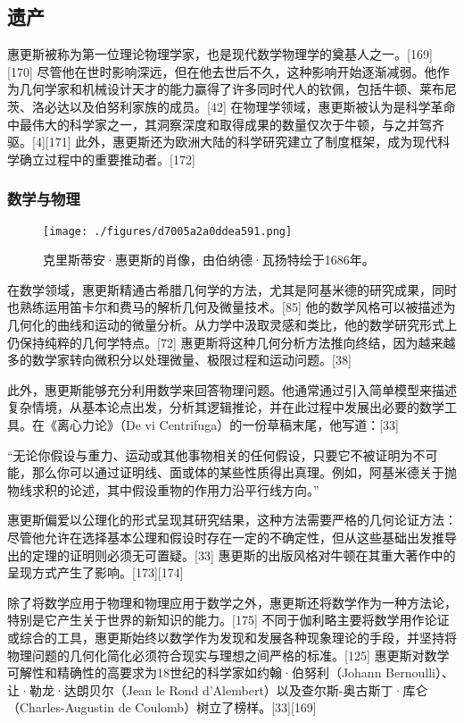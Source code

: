 \subsection{遗产}
惠更斯被称为第一位理论物理学家，也是现代数学物理学的奠基人之一。[169][170] 尽管他在世时影响深远，但在他去世后不久，这种影响开始逐渐减弱。他作为几何学家和机械设计天才的能力赢得了许多同时代人的钦佩，包括牛顿、莱布尼茨、洛必达以及伯努利家族的成员。[42] 在物理学领域，惠更斯被认为是科学革命中最伟大的科学家之一，其洞察深度和取得成果的数量仅次于牛顿，与之并驾齐驱。[4][171] 此外，惠更斯还为欧洲大陆的科学研究建立了制度框架，成为现代科学确立过程中的重要推动者。[172]
\subsubsection{数学与物理}
\begin{figure}[ht]
\centering
\texttt{[image: ./figures/d7005a2a0ddea591.png]}
\caption{克里斯蒂安·惠更斯的肖像，由伯纳德·瓦扬特绘于1686年。} \label{fig_HGS_17}
\end{figure}
在数学领域，惠更斯精通古希腊几何学的方法，尤其是阿基米德的研究成果，同时也熟练运用笛卡尔和费马的解析几何及微量技术。[85] 他的数学风格可以被描述为几何化的曲线和运动的微量分析。从力学中汲取灵感和类比，他的数学研究形式上仍保持纯粹的几何学特点。[72] 惠更斯将这种几何分析方法推向终结，因为越来越多的数学家转向微积分以处理微量、极限过程和运动问题。[38]

此外，惠更斯能够充分利用数学来回答物理问题。他通常通过引入简单模型来描述复杂情境，从基本论点出发，分析其逻辑推论，并在此过程中发展出必要的数学工具。在《离心力论》（De vi Centrifuga）的一份草稿末尾，他写道：[33]

“无论你假设与重力、运动或其他事物相关的任何假设，只要它不被证明为不可能，那么你可以通过证明线、面或体的某些性质得出真理。例如，阿基米德关于抛物线求积的论述，其中假设重物的作用力沿平行线方向。”

惠更斯偏爱以公理化的形式呈现其研究结果，这种方法需要严格的几何论证方法：尽管他允许在选择基本公理和假设时存在一定的不确定性，但从这些基础出发推导出的定理的证明则必须无可置疑。[33] 惠更斯的出版风格对牛顿在其重大著作中的呈现方式产生了影响。[173][174]

除了将数学应用于物理和物理应用于数学之外，惠更斯还将数学作为一种方法论，特别是它产生关于世界的新知识的能力。[175] 不同于伽利略主要将数学用作论证或综合的工具，惠更斯始终以数学作为发现和发展各种现象理论的手段，并坚持将物理问题的几何化简化必须符合现实与理想之间严格的标准。[125] 惠更斯对数学可解性和精确性的高要求为18世纪的科学家如约翰·伯努利（Johann Bernoulli）、让·勒龙·达朗贝尔（Jean le Rond d'Alembert）以及查尔斯-奥古斯丁·库仑（Charles-Augustin de Coulomb）树立了榜样。[33][169]

